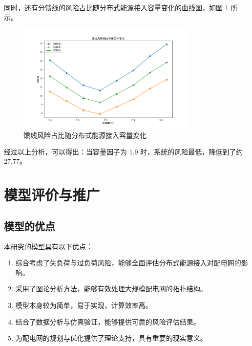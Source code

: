 \documentclass{article}
\begin{document}
同时，还有分馈线的风险占比随分布式能源接入容量变化的曲线图，如图 \ref{fig:line_risk_evolution} 所示。

\begin{figure}[H]
  \centering
  \includegraphics[width=0.8\textwidth]{problem2/dg_capacity_trending_feeder.png}
  \caption{馈线风险占比随分布式能源接入容量变化}
  \label{fig:line_risk_evolution}
\end{figure}

经过以上分析，可以得出：当容量因子为 1.9 时，系统的风险最低，降低到了约 27.77。


\section{模型评价与推广}\label{sec:evaluation}

\subsection{模型的优点}\label{subsec:advantages}

本研究的模型具有以下优点：

\begin{enumerate}
  \item 综合考虑了失负荷与过负荷风险，能够全面评估分布式能源接入对配电网的影响。
  \item 采用了图论分析方法，能够有效处理大规模配电网的拓扑结构。
  \item 模型本身较为简单，易于实现，计算效率高。
  \item 结合了数据分析与仿真验证，能够提供可靠的风险评估结果。
  \item 为配电网的规划与优化提供了理论支持，具有重要的现实意义。
\end{enumerate}
\end{document}
